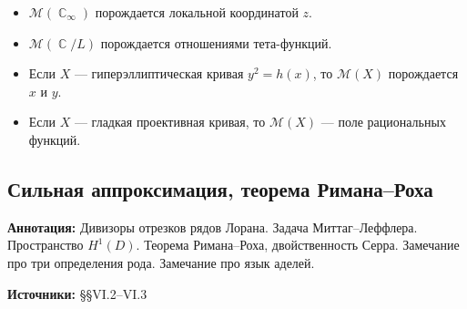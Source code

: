 \documentclass[a4paper, 12pt]{article}
\DeclareMathOperator{\CC}{\mathbb{C}}
\begin{document}
\begin{enumerate}[noitemsep,topsep=0pt]
    \begin{itemize}[noitemsep,topsep=0pt]
        \item $\mathcal{M}(\CC_\infty)$ порождается локальной координатой $z$.
        \item $\mathcal{M}(\CC/L)$ порождается отношениями тета-функций.
        \item Если $X$ --- гиперэллиптическая кривая $y^2=h(x)$, то $\mathcal{M}(X)$ порождается $x$ и $y$.
        \item Если $X$ --- гладкая проективная кривая, то $\mathcal{M}(X)$ --- поле рациональных функций.
    \end{itemize} %
\end{enumerate}

\subsection{Сильная аппроксимация, теорема Римана--Роха}

{\bf Аннотация:} Дивизоры отрезков рядов Лорана. Задача Миттаг--Леффлера. Пространство $H^1(D)$. Теорема Римана--Роха, двойственность Серра. Замечание про три определения рода. Замечание про язык аделей.

{\bf Источники:} \cite{Mir} \S\S VI.2--VI.3
\end{document}
